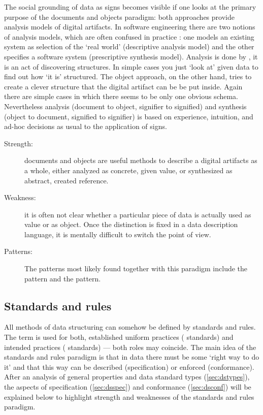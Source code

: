 The social grounding of data as signs becomes visible if one looks at the
primary purpose of the documents and objects paradigm: both approaches provide
analysis models of digital artifacts. In software engineering there are two
notions of analysis models, which are often confused in practice
\cite{Genova2005}: one models an existing system as selection of the `real
world' (descriptive analysis model) and the other specifies a software system
(prescriptive synthesis model).  Analysis is done by , it is an act of discovering structures. In simple cases you just
`look at' given data to find out how `it is' structured. The object approach,
on the other hand, tries to create a clever structure that the digital artifact
can be be put inside. Again there are simple cases in which there seems to be
only one obvious schema.  Nevertheless analysis (document to object, signifier
to signified) and synthesis (object to document, signified to signifier) is
based on experience, intuition, and ad-hoc decisions as usual to the
application of signs.  

\begin{description}
\item[Strength:] documents and objects are useful methods to describe a digital 
  artifacts as a whole, either analyzed as concrete, given value, or synthesized 
  as abstract, created reference.
\item[Weakness:] it is often not clear whether a particular piece of data 
  is actually used as value or as object. Once the distinction is fixed in a data
  description language, it is mentally difficult to switch the point of view.
\item[Patterns:] The patterns most likely found together with
  this paradigm include the  pattern and the 
  pattern.
\end{description}


\subsection{Standards and rules}
\label{sec:standardsrules}

All methods of data structuring can somehow be defined by standards and rules.
The term  is used for both, established uniform practices
( standards) and intended practices (
standards) --- both roles may coincide.  The main idea of the standards and
rules paradigm is that in data there must be some `right way to do it' and that
this way can be described (specification) or enforced (conformance). After an
analysis of general properties and data standard types (\ref{sec:dstypes}), the
aspects of specification (\ref{sec:dsspec}) and conformance (\ref{sec:dsconf})
will be explained below to highlight strength and weaknesses of the standards
and rules paradigm.

